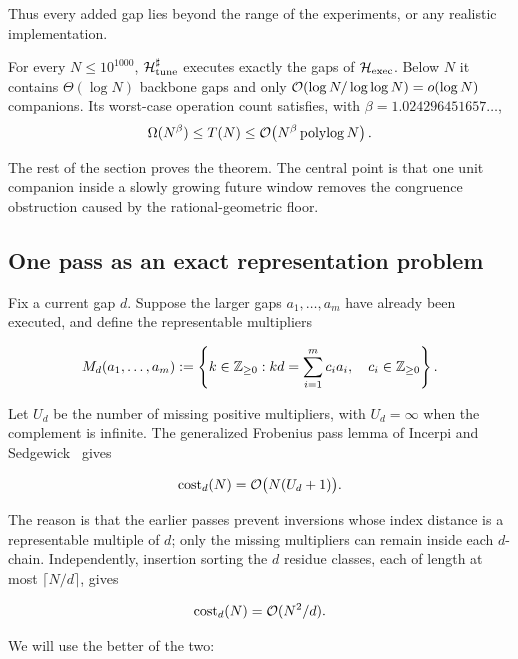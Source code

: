 Thus every added gap lies beyond the range of the experiments, or any
realistic implementation.

\begin{theorem}
  \label{thm:main-text}
  For every $N\le10^{1000}$, $\mathcal H^\sharp_{\rm tune}$ executes
  exactly the gaps of $\mathcal H_{\rm exec}$.  Below $N$ it contains
  $\Theta(\log N)$ backbone gaps and only
  $\mathcal{O}(\log N/\log\log N)=o(\log N)$ companions.  Its worst-case
  operation count satisfies, with
  $\beta=1.024296451657\ldots$,
  \[
    \Omega(N^\beta)\le T(N)\le
    \mathcal{O}\!\left(N^\beta\operatorname{polylog} N\right).
  \]
\end{theorem}

The rest of the section proves the theorem.  The central point is that one
unit companion inside a slowly growing future window removes the congruence
obstruction caused by the rational-geometric floor.

\subsection{One pass as an exact representation problem}

Fix a current gap $d$.  Suppose the larger gaps $a_1,\ldots,a_m$ have already
been executed, and define the representable multipliers

\[
  M_d(a_1,\ldots,a_m)
  :=\left\{k\in\mathbb{Z}_{\ge0}:
    kd=\sum_{i=1}^m c_i a_i,\quad c_i\in\mathbb{Z}_{\ge0}\right\}.
\]

Let $U_d$ be the number of missing positive multipliers, with $U_d=\infty$
when the complement is infinite.  The generalized Frobenius pass lemma of
Incerpi and Sedgewick~\cite[Lemma~1]{incerpi1985} gives

\begin{equation}
  \operatorname{cost}_d(N)=\mathcal{O}\bigl(N(U_d+1)\bigr).
  \label{eq:main-frobenius-pass}
\end{equation}

The reason is that the earlier passes prevent inversions whose index distance
is a representable multiple of $d$; only the missing multipliers can remain
inside each $d$-chain.  Independently, insertion sorting the $d$ residue
classes, each of length at most $\lceil N/d\rceil$, gives

\begin{equation}
  \operatorname{cost}_d(N)=\mathcal{O}(N^2/d).
  \label{eq:main-trivial-pass}
\end{equation}

We will use the better of the two:

